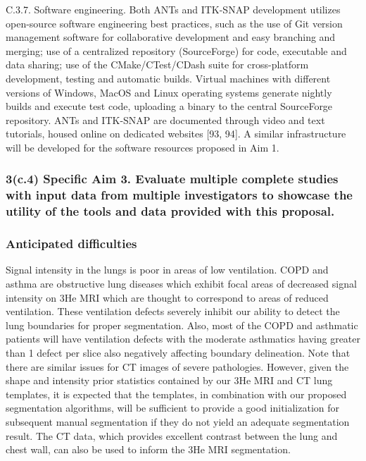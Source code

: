 \documentclass[11pt,]{article}
\begin{document}
C.3.7. Software engineering. Both ANTs and ITK-SNAP development utilizes
open-source software engineering best practices, such as the use of Git
version management software for collaborative development and easy
branching and merging; use of a centralized repository (SourceForge) for
code, executable and data sharing; use of the CMake/CTest/CDash suite
for cross-platform development, testing and automatic builds. Virtual
machines with different versions of Windows, MacOS and Linux operating
systems generate nightly builds and execute test code, uploading a
binary to the central SourceForge repository. ANTs and ITK-SNAP are
documented through video and text tutorials, housed online on dedicated
websites {[}93, 94{]}. A similar infrastructure will be developed for
the software resources proposed in Aim 1.

\subsubsection{3(c.4) \textbf{Specific Aim 3.} Evaluate multiple
complete studies with input data from multiple investigators to showcase
the utility of the tools and data provided with this
proposal.}\label{c.4-specific-aim-3.-evaluate-multiple-complete-studies-with-input-data-from-multiple-investigators-to-showcase-the-utility-of-the-tools-and-data-provided-with-this-proposal.}

\subsubsection{Anticipated difficulties}\label{anticipated-difficulties}

Signal intensity in the lungs is poor in areas of low ventilation. COPD
and asthma are obstructive lung diseases which exhibit focal areas of
decreased signal intensity on 3He MRI which are thought to correspond to
areas of reduced ventilation. These ventilation defects severely inhibit
our ability to detect the lung boundaries for proper segmentation. Also,
most of the COPD and asthmatic patients will have ventilation defects
with the moderate asthmatics having greater than 1 defect per slice also
negatively affecting boundary delineation. Note that there are similar
issues for CT images of severe pathologies. However, given the shape and
intensity prior statistics contained by our 3He MRI and CT lung
templates, it is expected that the templates, in combination with our
proposed segmentation algorithms, will be sufficient to provide a good
initialization for subsequent manual segmentation if they do not yield
an adequate segmentation result. The CT data, which provides excellent
contrast between the lung and chest wall, can also be used to inform the
3He MRI segmentation.
\end{document}
